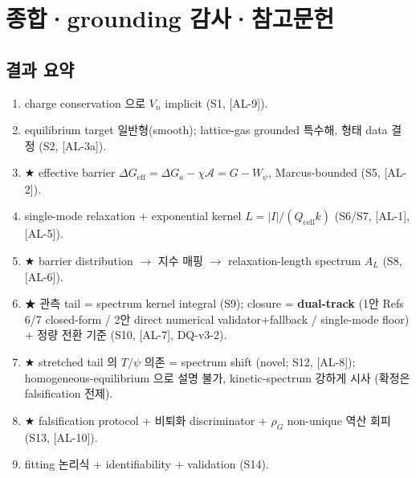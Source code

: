 \documentclass[11pt,a4paper]{article}
\newcommand{\eff}{\mathrm{eff}}
\newcommand{\cell}{\mathrm{cell}}
\newcommand{\AL}[1]{\textsf{[AL-#1]}}
\begin{document}
\section{종합·grounding 감사·참고문헌}\label{sec:summary}
\subsection{결과 요약}
\begin{enumerate}[label=\textbf{(R\arabic*)}]
\item charge conservation 으로 $V_n$ implicit (S1, \AL{9}).
\item equilibrium target 일반형(smooth); lattice-gas grounded 특수해, 형태 data 결정 (S2, \AL{3a}).
\item ★ effective barrier $\Delta G_\eff=\Delta G_a-\chi\mathcal A=G-W_\psi$, Marcus-bounded (S5, \AL{2}).
\item single-mode relaxation + exponential kernel $L=|I|/(Q_\cell k)$ (S6/S7, \AL{1},\AL{5}).
\item ★ barrier distribution $\to$ 지수 매핑 $\to$ relaxation-length spectrum $A_L$ (S8, \AL{6}).
\item ★ 관측 tail = spectrum kernel integral (S9); closure = \textbf{dual-track} (1안 Refs 6/7
  closed-form / 2안 direct numerical validator+fallback / single-mode floor) + 정량 전환 기준
  (S10, \AL{7}, DQ-v3-2).
\item ★ stretched tail 의 $T/\psi$ 의존 = spectrum shift (novel; S12, \AL{8}); homogeneous-equilibrium 으로 설명 불가, kinetic-spectrum 강하게 시사 (확정은 falsification 전제).
\item ★ falsification protocol + 비퇴화 discriminator + $\rho_G$ non-unique 역산 회피 (S13, \AL{10}).
\item fitting 논리식 + identifiability + validation (S14).
\end{enumerate}
\end{document}
